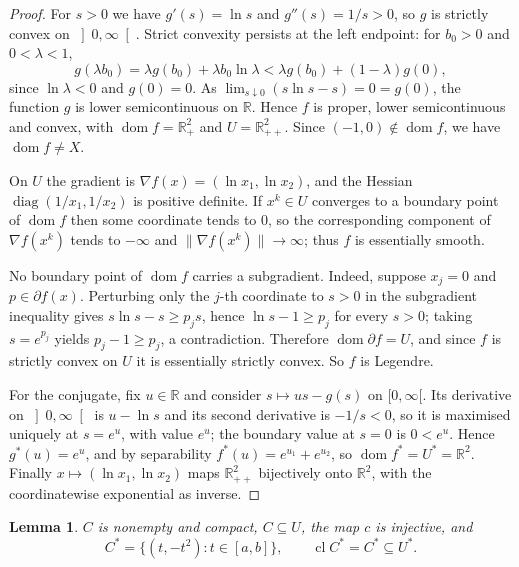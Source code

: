 \documentclass[11pt]{amsart}
\theoremstyle{plain}
\newtheorem{lemma}[theorem]{Lemma}
\theoremstyle{definition}
\theoremstyle{remark}
\newcommand{\R}{\mathbb{R}}
\newcommand{\dom}{\operatorname{dom}}
\newcommand{\cl}{\operatorname{cl}}
\newcommand{\Cstar}{C^{*}}
\begin{document}
\begin{proof}
For $s > 0$ we have $g'(s) = \ln s$ and $g''(s) = 1/s > 0$, so $g$ is strictly
convex on $\left]0,\infty\right[$. Strict convexity persists at the left
endpoint: for $b_{0} > 0$ and $0 < \lambda < 1$,
\[
  g(\lambda b_{0})
  = \lambda g(b_{0}) + \lambda b_{0} \ln \lambda
  < \lambda g(b_{0}) + (1 - \lambda) g(0),
\]
since $\ln \lambda < 0$ and $g(0) = 0$. As
$\lim_{s \downarrow 0} (s \ln s - s) = 0 = g(0)$, the function $g$ is lower
semicontinuous on $\R$. Hence $f$ is proper, lower semicontinuous and convex,
with $\dom f = \R^{2}_{+}$ and $U = \R^{2}_{++}$. Since
$(-1,0) \notin \dom f$, we have $\dom f \neq X$.

On $U$ the gradient is $\nabla f(x) = (\ln x_{1}, \ln x_{2})$, and the Hessian
$\operatorname{diag}(1/x_{1}, 1/x_{2})$ is positive definite. If
$x^{k} \in U$ converges to a boundary point of $\dom f$ then some coordinate
tends to $0$, so the corresponding component of $\nabla f(x^{k})$ tends to
$-\infty$ and $\lVert \nabla f(x^{k}) \rVert \to \infty$; thus $f$ is
essentially smooth.

No boundary point of $\dom f$ carries a subgradient. Indeed, suppose
$x_{j} = 0$ and $p \in \partial f(x)$. Perturbing only the $j$-th coordinate to
$s > 0$ in the subgradient inequality gives $s \ln s - s \ge p_{j} s$, hence
$\ln s - 1 \ge p_{j}$ for every $s > 0$; taking $s = e^{p_{j}}$ yields
$p_{j} - 1 \ge p_{j}$, a contradiction. Therefore
$\dom \partial f = U$, and since $f$ is strictly convex on $U$ it is
essentially strictly convex. So $f$ is Legendre.

For the conjugate, fix $u \in \R$ and consider $s \mapsto us - g(s)$ on
$[0,\infty[$. Its derivative on $\left]0,\infty\right[$ is $u - \ln s$ and its
second derivative is $-1/s < 0$, so it is maximised uniquely at $s = e^{u}$,
with value $e^{u}$; the boundary value at $s = 0$ is $0 < e^{u}$. Hence
$g^{*}(u) = e^{u}$, and by separability $f^{*}(u) = e^{u_{1}} + e^{u_{2}}$, so
$\dom f^{*} = U^{*} = \R^{2}$. Finally $x \mapsto (\ln x_{1}, \ln x_{2})$ maps
$\R^{2}_{++}$ bijectively onto $\R^{2}$, with the coordinatewise exponential as
inverse.
\end{proof}

\begin{lemma}\label{lem:C}
$C$ is nonempty and compact, $C \subseteq U$, the map $c$ is injective, and
\[
  \Cstar = \{ (t, -t^{2}) : t \in [a,b] \},
  \qquad
  \cl \Cstar = \Cstar \subseteq U^{*} .
\]
\end{lemma}
\end{document}
